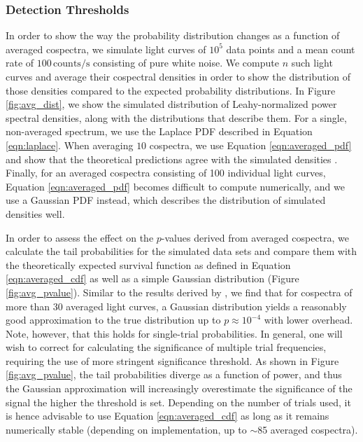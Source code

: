 \documentclass[12pt]{emulateapj}
\begin{document}
\subsubsection{Detection Thresholds}
\label{sec:averaged_detthres}

In order to show the way the probability distribution changes as a function of averaged cospectra, we simulate light curves of $10^{5}$ data points and a mean count rate of $100\,\mathrm{counts}/\mathrm{s}$ consisting of pure white noise. We compute $n$ such light curves and average their cospectral densities in order to show the distribution of those densities compared to the expected probability distributions. In Figure \ref{fig:avg_dist}, we show the simulated distribution of Leahy-normalized power spectral densities, along with the distributions that describe them. For a single, non-averaged spectrum, we use the Laplace PDF described in Equation \ref{eqn:laplace}. When averaging $10$ cospectra, we use Equation \ref{eqn:averaged_pdf} and show that the theoretical predictions agree with the simulated densities . Finally, for an averaged cospectra consisting of 100 individual light curves, Equation \ref{eqn:averaged_pdf} becomes difficult to compute numerically, and we use a Gaussian PDF instead, which describes the distribution of simulated densities well. 

In order to assess the effect on the $p$-values derived from averaged cospectra, we calculate the tail probabilities for the simulated data sets and compare them with the theoretically expected survival function as defined in Equation \ref{eqn:averaged_cdf} as well as a simple Gaussian distribution (Figure \ref{fig:avg_pvalue}). Similar to the results derived by \citet{balakrishnan1986}, we find that for cospectra of more than 30 averaged light curves, a Gaussian distribution yields a reasonably good approximation to the true distribution up to $p \approx 10^{-4}$ with lower overhead. Note, however, that this holds for single-trial probabilities. In general, one will wish to correct for calculating the significance of multiple trial frequencies, requiring the use of more stringent significance threshold. As shown in Figure \ref{fig:avg_pvalue}, the tail probabilities diverge as a function of power, and thus the Gaussian approximation will increasingly overestimate the significance of the signal the higher the threshold is set. Depending on the number of trials used, it is hence advisable to use Equation \ref{eqn:averaged_cdf} as long as it remains numerically stable (depending on implementation, up to $\sim$85 averaged cospectra).
\end{document}
